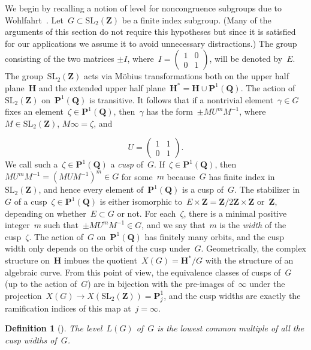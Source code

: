 \documentclass[10pt]{amsart}
\def\Z{\mathbf{Z}}
\def\Q{\mathbf{Q}}
\newtheorem{df}[subsubsection]{Definition}
\theoremstyle{remark}
\numberwithin{equation}{subsection}
\def\numequation{\addtocounter{subsubsection}{1}\begin{equation}}
\def\SL{\mathrm{SL}}
\def\H{\mathbf{H}}
\begin{document}
We begin by recalling a notion of level for noncongruence subgroups
due to Wohlfahrt~\cite{Wohlfahrt}.
Let~$G \subset \SL_2(\Z)$ be a finite index subgroup. (Many of the arguments of
this section do not require this hypotheses but since it is  satisfied for our applications
we assume it to avoid unnecessary distractions.)
The group consisting of the two matrices $\pm  I$,
where~$I =  \left( \begin{matrix} 1 & 0 \\ 0 & 1 \end{matrix} \right)$,
will be denoted by~$E$.
The group~$\SL_2(\Z)$ acts via M\"{o}bius transformations both on the upper half plane~$\H$ and the extended upper half 
plane~$\H^* = \H \cup \mathbf{P}^1(\Q)$. 
The action of~$\SL_2(\Z)$ on~$\mathbf{P}^1(\Q)$ is transitive. It follows that 
if a nontrivial element~$\gamma \in G$  fixes an element~$\zeta \in \mathbf{P}^1(\Q)$,
then~$\gamma$ has the form~$\pm M U^m M^{-1}$, where~$M  \in \SL_2(\Z)$, $M  \infty = \zeta$, and
\numequation
\label{levelN}
U = \left( \begin{matrix} 1 & 1 \\ 0 & 1 \end{matrix} \right).
\end{equation}
We call such a~$\zeta \in \mathbf{P}^1(\Q)$ a \emph{cusp} of~$G$.
If~$\zeta \in \mathbf{P}^1(\Q)$, then~$ M U^m M^{-1}  = (M U M^{-1})^m \in G$ for some~$m$ because~$G$
has finite index in~$\SL_2(\Z)$, and hence every element of~$\mathbf{P}^1(\Q)$ is a cusp of~$G$. 
The stabilizer in~$G$ of a cusp~$\zeta \in \mathbf{P}^1(\Q)$ is either isomorphic to~$E \times \Z = \Z/2 \Z \times \Z$ or~$\Z$,
depending on whether~$E \subset G$ or not. For each~$\zeta$, there is a minimal positive integer~$m$ such
that~$\pm M U^m M^{-1} \in G$, and we say that~$m$ is the \emph{width} of the cusp~$\zeta$. The action of~$G$ on~$\mathbf{P}^1(\Q)$
has finitely many orbits, and the cusp width only depends on the orbit of the cusp under~$G$.
Geometrically, the complex structure on~$\H$ imbues the quotient~$X(G) = \H^*/G$ with the structure of an algebraic curve.
From this point of view,  the equivalence classes
of cusps of~$G$ (up to the action of~$G$) are in bijection with  the pre-images of~$\infty$ under the 
projection~$X(G) \rightarrow X(\SL_2(\Z)) = \mathbf{P}^1_j$, and the cusp widths are exactly the ramification indices
of this map at~$j = \infty$.


\begin{df}[\cite{Wohlfahrt}] 
The level~$L(G)$ of~$G$ is  the lowest common multiple of all the cusp widths of~$G$.
\end{df}
\end{document}
